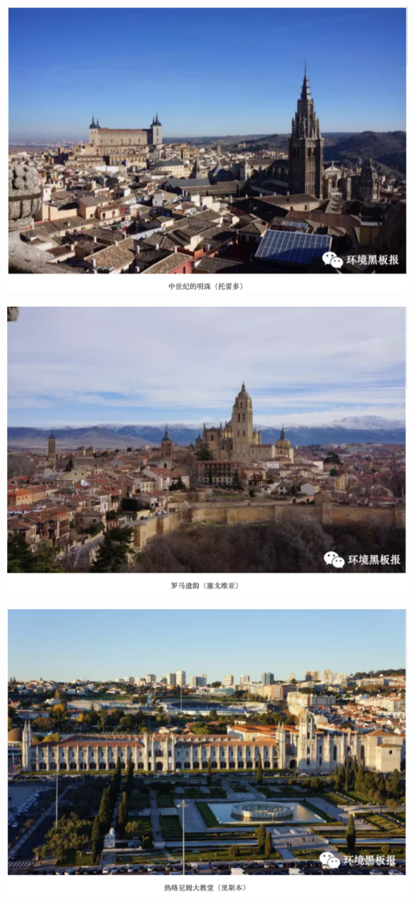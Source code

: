 \documentclass[]{book}
\begin{document}
\includegraphics[width=8.33in]{images/xt4}

\includegraphics[width=8.33in]{images/xt5}

\includegraphics[width=8.33in]{images/xt6}
\end{document}
